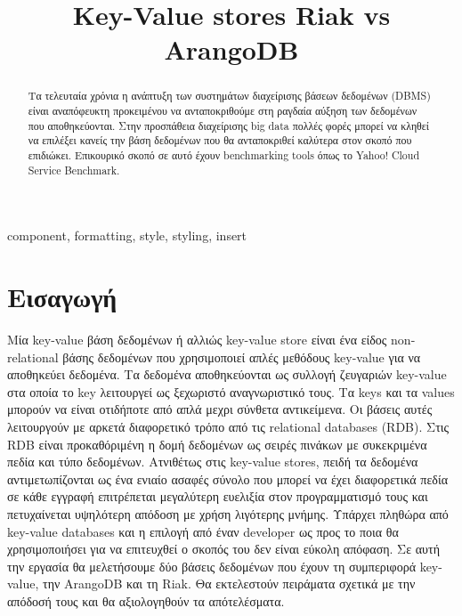 \documentclass[conference]{IEEEtran}
\begin{document}
\title{Key-Value stores Riak vs ArangoDB \\

}

\author{
\and
{}
\and
{}
}

\maketitle

\begin{abstract}
    Τα τελευταία χρόνια η ανάπτυξη των συστημάτων 
διαχείρισης βάσεων δεδομένων (DBMS) είναι αναπόφευκτη προκειμένου να 
ανταποκριθούμε στη ραγδαία αύξηση των δεδομένων που 
αποθηκεύονται. Στην προσπάθεια διαχείρισης big data 
πολλές φορές μπορεί να κληθεί να επιλέξει κανείς την 
βάση δεδομένων που θα ανταποκριθεί καλύτερα στον σκοπό 
που επιδιώκει. Επικουρικό σκοπό σε αυτό έχουν benchmarking 
tools όπως το Yahoo! Cloud Service Benchmark.

\end{abstract}

\begin{IEEEkeywords}
component, formatting, style, styling, insert
\end{IEEEkeywords}

\section{Εισαγωγή}
Μία key-value βάση δεδομένων ή αλλιώς key-value store είναι ένα είδος non-relational βάσης δεδομένων που χρησιμοποιεί απλές μεθόδους key-value για να αποθηκεύει δεδομένα. Τα δεδομένα αποθηκεύονται ως συλλογή ζευγαριών key-value στα οποία το key λειτουργεί ως ξεχωριστό αναγνωριστικό τους. Τα keys και τα values μπορούν να είναι οτιδήποτε από απλά μεχρι σύνθετα αντικείμενα. Οι βάσεις αυτές λειτουργούν με αρκετά διαφορετικό τρόπο από τις relational databases (RDB). Στις RDB είναι προκαθόριμένη η δομή δεδομένων ως σειρές πινάκων με συκεκριμένα πεδία και τύπο δεδομένων. Ατνιθέτως στις key-value stores, πειδή τα δεδομένα αντιμετωπίζονται ως ένα ενιαίο ασαφές σύνολο που μπορεί να έχει διαφορετικά πεδία σε κάθε εγγραφή επιτρέπεται μεγαλύτερη ευελιξία στον προγραμματισμό τους και πετυχαίνεται υψηλότερη απόδοση με χρήση λιγότερης μνήμης. Υπάρχει πληθώρα από key-value databases και η επιλογή από έναν developer ως προς το ποια θα χρησιμοποιήσει για να επιτευχθεί ο σκοπός του δεν είναι εύκολη απόφαση. Σε αυτή την εργασία θα μελετήσουμε δύο βάσεις δεδομένων που έχουν τη συμπεριφορά key-value, την ArangoDB και τη Riak. Θα εκτελεστούν πειράματα σχετικά με την απόδοσή τους και θα αξιολογηθούν τα απότελέσματα.
\end{document}
